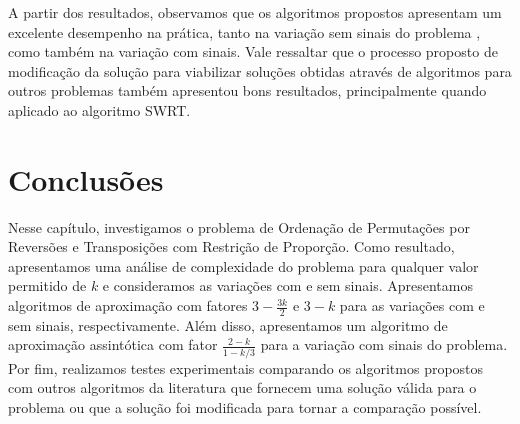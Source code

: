 A partir dos resultados, observamos que os algoritmos propostos apresentam um excelente desempenho na prática, tanto na variação sem sinais do problema \SbPRT, como também na variação com sinais. Vale ressaltar que o processo proposto de modificação da solução para viabilizar soluções obtidas através de algoritmos para outros problemas também apresentou bons resultados, principalmente quando aplicado ao algoritmo SWRT.

\section{Conclusões}

Nesse capítulo, investigamos o problema de Ordenação de Permutações por Reversões e Transposições com Restrição de Proporção. Como resultado, apresentamos uma análise de complexidade do problema para qualquer valor permitido de $k$ e consideramos as variações com e sem sinais. Apresentamos algoritmos de aproximação com fatores $3 - \frac{3k}{2}$ e $3-k$ para as variações com e sem sinais, respectivamente. Além disso, apresentamos um algoritmo de aproximação assintótica com fator $\frac{2-k}{1-k/3}$ para a variação com sinais do problema. Por fim, realizamos testes experimentais comparando os algoritmos propostos com outros algoritmos da literatura que fornecem uma solução válida para o problema ou que a solução foi modificada para tornar a comparação possível.